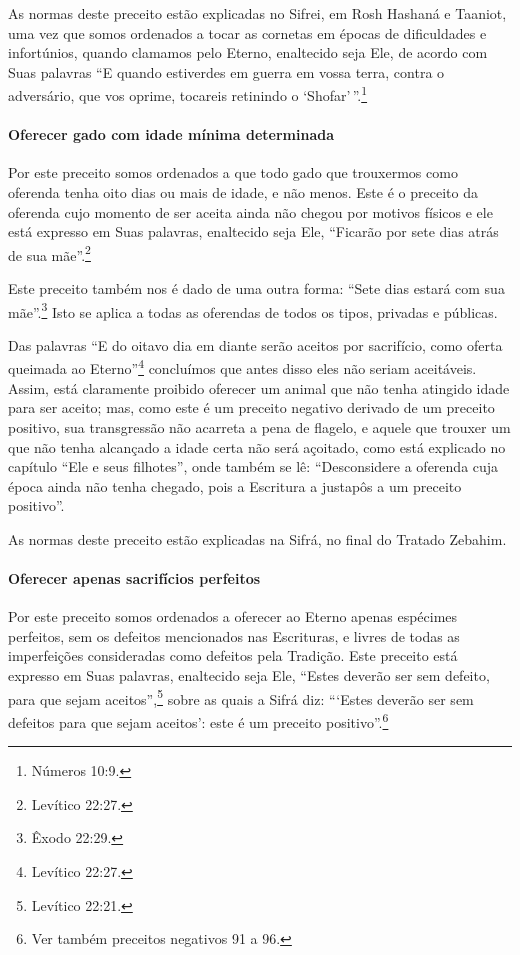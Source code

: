 As normas deste preceito estão explicadas no Sifrei, em Rosh Hashaná e
Taaniot, uma vez que somos ordenados a tocar as cornetas em épocas de
dificuldades e infortúnios, quando clamamos pelo Eterno, enaltecido
seja Ele, de acordo com Suas palavras ``E quando estiverdes em guerra
em vossa terra, contra o adversário, que vos oprime, tocareis retinindo
o `Shofar'\,''.\footnote{Números 10:9.}

\paragraph{Oferecer gado com idade mínima determinada}

Por este preceito somos ordenados a que todo gado que trouxermos como
oferenda tenha oito dias ou mais de idade, e não menos. Este é o
preceito da oferenda cujo momento de ser aceita ainda não chegou por
motivos físicos e ele está expresso em Suas palavras, enaltecido seja
Ele, ``Ficarão por sete dias atrás de sua mãe''.\footnote{Levítico 22:27.}

Este preceito também nos é dado de uma outra forma: ``Sete dias estará
com sua mãe''.\footnote{Êxodo 22:29.} Isto se aplica a todas as oferendas de
todos os tipos, privadas e públicas.

Das palavras ``E do oitavo dia em diante serão aceitos por sacrifício,
como oferta queimada ao Eterno''\footnote{Levítico 22:27.} concluímos que antes
disso eles não seriam aceitáveis. Assim, está claramente proibido
oferecer um animal que não tenha atingido idade para ser aceito; mas,
como este é um preceito negativo derivado de um preceito positivo, sua
transgressão não acarreta a pena de flagelo, e aquele que trouxer um que
não tenha alcançado a idade certa não será açoitado, como está explicado
no capítulo ``Ele e seus filhotes'', onde também se lê: ``Desconsidere
a oferenda cuja época ainda não tenha chegado, pois a Escritura a
justapôs a um preceito positivo''.

As normas deste preceito estão explicadas na Sifrá, no final do Tratado
Zebahim.

\paragraph{Oferecer apenas sacrifícios perfeitos}

Por este preceito somos ordenados a oferecer ao Eterno apenas espécimes
perfeitos, sem os defeitos mencionados nas Escrituras, e livres de todas
as imperfeições consideradas como defeitos pela Tradição. Este preceito
está expresso em Suas palavras, enaltecido seja Ele, ``Estes deverão ser
sem defeito, para que sejam aceitos'',\footnote{Levítico 22:21.} sobre as quais a
Sifrá diz: ```Estes deverão ser sem defeitos para que sejam aceitos':
este é um preceito positivo''.\footnote{Ver também preceitos negativos 91 a 96.}

